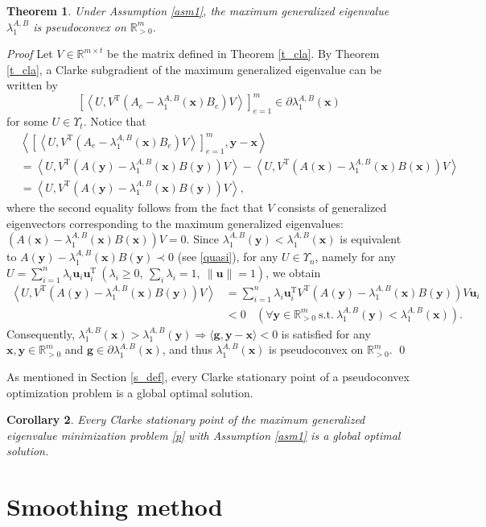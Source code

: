 \documentclass[sn-mathphys,Numbered]{sn-jnl}%
\theoremstyle{thmstyleone}%
\newtheorem{theorem}{Theorem}%
\theoremstyle{thmstyletwo}%
\theoremstyle{thmstylethree}%
\newtheorem{corollary}[theorem]{Corollary}
\newcommand{\e}[1]{\begin{equation}#1\end{equation}}
\newcommand{\squ}[1]{\left[#1\right]}
\newcommand{\ang}[1]{\left\langle#1\right\rangle}
\def\tp{\mathrm{T}}
\def\lamx{\lambda^{A,B}_1(\boldsymbol{x})}
\def\lamy{\lambda^{A,B}_1(\boldsymbol{y})}
\def\cpartial{\partial}
\begin{document}
\begin{theorem}
Under Assumption \ref{asm1}, the maximum generalized eigenvalue $\lambda_1^{A,B}$ is pseudoconvex on $\mathbb{R}^m_{>0}$.
\label{t_pse}
\end{theorem}
{\it Proof }
Let $V\in\mathbb{R}^{m\times t}$ be the matrix defined in Theorem \ref{t_cla}. By Theorem \ref{t_cla}, a Clarke subgradient of the maximum generalized eigenvalue can be written by
\e{
\squ{\ang{U,V^\tp\left(A_e-\lamx B_e\right)V}}_{e=1}^m\in\cpartial\lamx
}
for some $U\in\Upsilon_t$. Notice that
\begin{align}
&\ang{\squ{\ang{U,V^\tp\left(A_e-\lamx B_e\right)V}}_{e=1}^m,\bm{y}-\bm{x}}\\
& = \ang{U,V^\tp\left(A(\bm{y})-\lamx B(\bm{y})\right)V}-\ang{U,V^\tp\left(A(\bm{x})-\lamx B(\bm{x})\right)V}\\
& = \ang{U,V^\tp\left(A(\bm{y})-\lamx B(\bm{y})\right)V},
\label{thr}
\end{align}
where the second equality follows from the fact that $V$ consists of generalized eigenvectors corresponding to the maximum generalized eigenvalues: $(A(\bm{x})-\lamx B(\bm{x}))V=0$. Since $\lamy<\lamx$ is equivalent to $A(\bm{y})-\lamx B(\bm{y})\prec 0$ (see \eqref{quasi}), for any $U\in\Upsilon_n$, namely for any $U=\sum_{i=1}^n \lambda_i\bm{u}_i\bm{u}_i^\tp\ (\lambda_i\ge 0,\ \sum_i\lambda_i=1,\ \|\bm{u}\|=1)$, we obtain
\begin{align}
\ang{U,V^\tp\left(A(\bm{y})-\lamx B(\bm{y})\right)V}
& = \sum_{i=1}^n\lambda_i\bm{u}_i^\tp V^\tp\left(A(\bm{y})-\lamx B(\bm{y})\right)V\bm{u}_i\\
& < 0\ \ \ \ (\forall\bm{y}\in \mathbb{R}^m_{>0}\ \mathrm{s.t.}\ \lamy<\lamx).
\end{align}
Consequently, $\lamx>\lamy \Rightarrow \langle\bm{g},\bm{y}-\bm{x}\rangle < 0$ is satisfied for any $\bm{x},\bm{y}\in\mathbb{R}^m_{>0}$ and $\bm{g}\in\partial\lamx$, and thus $\lamx$ is pseudoconvex on $\mathbb{R}^m_{>0}$.
\qed

As mentioned in Section \ref{s_def}, every Clarke stationary point of a pseudoconvex optimization problem is a global optimal solution.

\begin{corollary}
Every Clarke stationary point of the maximum generalized eigenvalue minimization problem \eqref{p} with Assumption \ref{asm1} is a global optimal solution.
\label{c_opt}
\end{corollary}

\section{Smoothing method}
\end{document}
